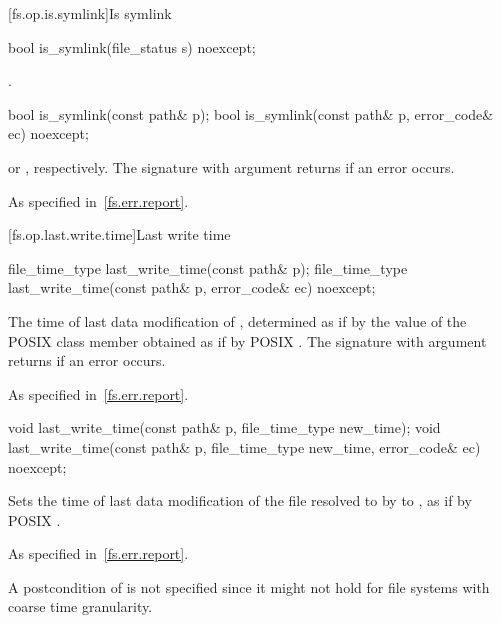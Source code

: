 [fs.op.is.symlink]{Is symlink}

%
\begin{itemdecl}
bool is_symlink(file_status s) noexcept;
\end{itemdecl}

\begin{itemdescr}
\pnum
\returns
{}.
\end{itemdescr}

%
\begin{itemdecl}
bool is_symlink(const path& p);
bool is_symlink(const path& p, error_code& ec) noexcept;
\end{itemdecl}

\begin{itemdescr}
\pnum
\returns
{} or ,
  respectively. The signature with argument  returns 
  if an error occurs.

\pnum
\throws
As specified in~\ref{fs.err.report}.
\end{itemdescr}


[fs.op.last.write.time]{Last write time}

%
\begin{itemdecl}
file_time_type last_write_time(const path& p);
file_time_type last_write_time(const path& p, error_code& ec) noexcept;
\end{itemdecl}

\begin{itemdescr}
\pnum
\returns
The time of last data modification of ,
  determined as if by the value of the POSIX  class member 
  obtained as if by POSIX .
  The signature with argument  returns 
  if an error occurs.

\pnum
\throws
As specified in~\ref{fs.err.report}.
\end{itemdescr}

%
\begin{itemdecl}
void last_write_time(const path& p, file_time_type new_time);
void last_write_time(const path& p, file_time_type new_time,
                     error_code& ec) noexcept;
\end{itemdecl}

\begin{itemdescr}
\pnum
\effects
Sets the time of last data modification of the file
  resolved to by  to , as if by POSIX .

\pnum
\throws
As specified in~\ref{fs.err.report}.

\pnum
\begin{note}
A postcondition of  is not specified since it might not hold for file systems
  with coarse time granularity.
\end{note}
\end{itemdescr}

